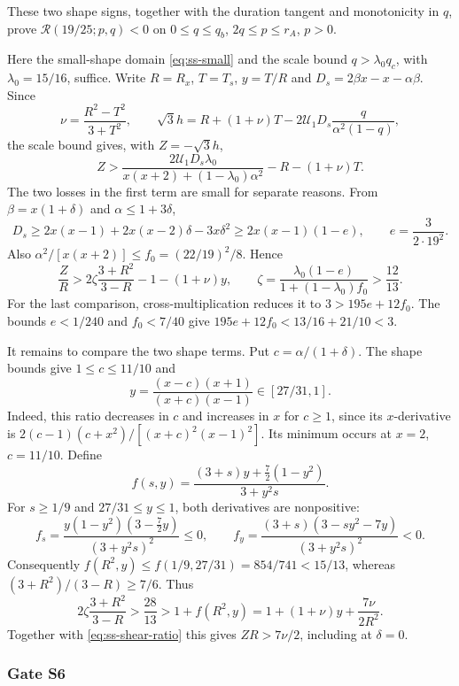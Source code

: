 These two shape signs, together with the duration tangent and monotonicity in $q$,
prove $\mathcal R(19/25;p,q)<0$ on $0\le q\le q_b$, $2q\le p\le r_A$, $p>0$.

\label{app:ss-shear}
Here the small-shape domain \eqref{eq:ss-small} and the scale bound $q>\lambda_0q_c$, with
$\lambda_0=15/16$, suffice. Write $R=R_x$, $T=T_s$, $y=T/R$ and
$D_s=2\beta x-x-\alpha\beta$. Since
\[
 \nu=\frac{R^2-T^2}{3+T^2},\qquad
 \sqrt3h=R+(1+\nu)T-2\mathcal U_1D_s\frac{q}{\alpha^2(1-q)},
\]
the scale bound gives, with $Z=-\sqrt3h$,
\[
 Z>\frac{2\mathcal U_1D_s\lambda_0}
          {x(x+2)+(1-\lambda_0)\alpha^2}-R-(1+\nu)T.
\]
The two losses in the first term are small for separate reasons. From
$\beta=x(1+\delta)$ and $\alpha\le1+3\delta$,
\[
 D_s\ge2x(x-1)+2x(x-2)\delta-3x\delta^2
       \ge2x(x-1)(1-e),\qquad e=\frac{3}{2\cdot19^2}.
\]
Also $\alpha^2/[x(x+2)]\le f_0=(22/19)^2/8$. Hence
\begin{equation}\label{eq:ss-shear-ratio}
 \frac ZR>
  2\zeta\frac{3+R^2}{3-R}-1-(1+\nu)y,\qquad
 \zeta=\frac{\lambda_0(1-e)}{1+(1-\lambda_0)f_0}>\frac{12}{13}.
\end{equation}
For the last comparison, cross-multiplication reduces it to $3>195e+12f_0$.
The bounds $e<1/240$ and $f_0<7/40$ give
$195e+12f_0<13/16+21/10<3$.

It remains to compare the two shape terms. Put $c=\alpha/(1+\delta)$. The shape bounds give
$1\le c\le11/10$ and
\[
 y=\frac{(x-c)(x+1)}{(x+c)(x-1)}\in[27/31,1].
\]
Indeed, this ratio decreases in $c$ and increases in $x$ for $c\ge1$, since its $x$-derivative is
$2(c-1)(c+x^2)/[(x+c)^2(x-1)^2]$. Its minimum occurs at $x=2$, $c=11/10$.
Define
\[
 f(s,y)=\frac{(3+s)y+\frac72(1-y^2)}{3+y^2s}.
\]
For $s\ge1/9$ and $27/31\le y\le1$, both derivatives are nonpositive:
\[
 f_s=\frac{y(1-y^2)(3-\frac72y)}{(3+y^2s)^2}\le0,\qquad
 f_y=\frac{(3+s)(3-sy^2-7y)}{(3+y^2s)^2}<0.
\]
Consequently $f(R^2,y)\le f(1/9,27/31)=854/741<15/13$, whereas
$(3+R^2)/(3-R)\ge7/6$. Thus
\[
 2\zeta\frac{3+R^2}{3-R}>\frac{28}{13}>1+f(R^2,y)
 =1+(1+\nu)y+\frac{7\nu}{2R^2}.
\]
Together with \eqref{eq:ss-shear-ratio} this gives $ZR>7\nu/2$, including at $\delta=0$.

\subsubsection{Gate S6}\label{app:ss-S6}

